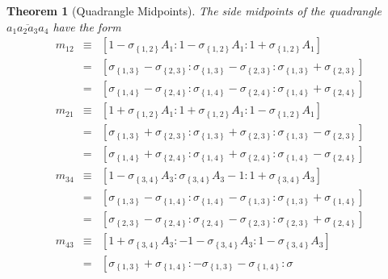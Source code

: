 \documentclass{unswthesis}
\newtheorem{theorem}{Theorem}
\begin{document}
\begin{theorem}[Quadrangle Midpoints]
The side midpoints of the quadrangle $\overline{a_{1}a_{2}a_{3}a_{4}}$ have
the form%
\begin{eqnarray*}
m_{12} &\equiv &\left[ 1-\sigma _{\left\{ 1,2\right\} }A_{1}:1-\sigma
_{\left\{ 1,2\right\} }A_{1}:1+\sigma _{\left\{ 1,2\right\} }A_{1}\right]  \\
&=&\left[ \sigma _{\left\{ 1,3\right\} }-\sigma _{\left\{ 2,3\right\}
}:\sigma _{\left\{ 1,3\right\} }-\sigma _{\left\{ 2,3\right\} }:\sigma
_{\left\{ 1,3\right\} }+\sigma _{\left\{ 2,3\right\} }\right]  \\
&=&\left[ \sigma _{\left\{ 1,4\right\} }-\sigma _{\left\{ 2,4\right\}
}:\sigma _{\left\{ 1,4\right\} }-\sigma _{\left\{ 2,4\right\} }:\sigma
_{\left\{ 1,4\right\} }+\sigma _{\left\{ 2,4\right\} }\right]  \\
m_{21} &\equiv &\left[ 1+\sigma _{\left\{ 1,2\right\} }A_{1}:1+\sigma
_{\left\{ 1,2\right\} }A_{1}:1-\sigma _{\left\{ 1,2\right\} }A_{1}\right]  \\
&=&\left[ \sigma _{\left\{ 1,3\right\} }+\sigma _{\left\{ 2,3\right\}
}:\sigma _{\left\{ 1,3\right\} }+\sigma _{\left\{ 2,3\right\} }:\sigma
_{\left\{ 1,3\right\} }-\sigma _{\left\{ 2,3\right\} }\right]  \\
&=&\left[ \sigma _{\left\{ 1,4\right\} }+\sigma _{\left\{ 2,4\right\}
}:\sigma _{\left\{ 1,4\right\} }+\sigma _{\left\{ 2,4\right\} }:\sigma
_{\left\{ 1,4\right\} }-\sigma _{\left\{ 2,4\right\} }\right] 
\end{eqnarray*}%
\begin{eqnarray*}
m_{34} &\equiv &\left[ 1-\sigma _{\left\{ 3,4\right\} }A_{3}:\sigma
_{\left\{ 3,4\right\} }A_{3}-1:1+\sigma _{\left\{ 3,4\right\} }A_{3}\right] 
\\
&=&\left[ \sigma _{\left\{ 1,3\right\} }-\sigma _{\left\{ 1,4\right\}
}:\sigma _{\left\{ 1,4\right\} }-\sigma _{\left\{ 1,3\right\} }:\sigma
_{\left\{ 1,3\right\} }+\sigma _{\left\{ 1,4\right\} }\right]  \\
&=&\left[ \sigma _{\left\{ 2,3\right\} }-\sigma _{\left\{ 2,4\right\}
}:\sigma _{\left\{ 2,4\right\} }-\sigma _{\left\{ 2,3\right\} }:\sigma
_{\left\{ 2,3\right\} }+\sigma _{\left\{ 2,4\right\} }\right]  \\
m_{43} &\equiv &\left[ 1+\sigma _{\left\{ 3,4\right\} }A_{3}:-1-\sigma
_{\left\{ 3,4\right\} }A_{3}:1-\sigma _{\left\{ 3,4\right\} }A_{3}\right]  \\
&=&\left[ \sigma _{\left\{ 1,3\right\} }+\sigma _{\left\{ 1,4\right\}
}:-\sigma _{\left\{ 1,3\right\} }-\sigma _{\left\{ 1,4\right\} }:\sigma

\end{eqnarray*}
\end{theorem}
\end{document}
